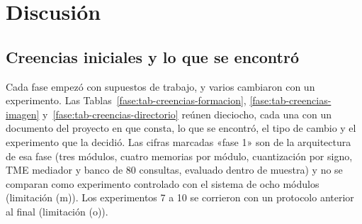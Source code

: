 \section{Discusión}
\label{sec:discusion}

\subsection{Creencias iniciales y lo que se encontró}
\label{sec:creencias}

Cada fase empezó con supuestos de trabajo, y varios cambiaron con un experimento.
Las Tablas~\ref{fase:tab-creencias-formacion}, \ref{fase:tab-creencias-imagen}
y~\ref{fase:tab-creencias-directorio} reúnen dieciocho, cada una con un documento del
proyecto en que consta, lo que se encontró, el tipo de cambio y el experimento que la
decidió.
Las cifras marcadas «fase 1» son de la arquitectura de esa fase (tres módulos, cuatro
memorias por módulo, cuantización por signo, TME mediador y banco de 80 consultas,
evaluado dentro de muestra) y no se comparan como experimento controlado con el sistema
de ocho módulos (limitación (m)).
Los experimentos 7 a 10 se corrieron con un protocolo anterior al final (limitación
(o)).

